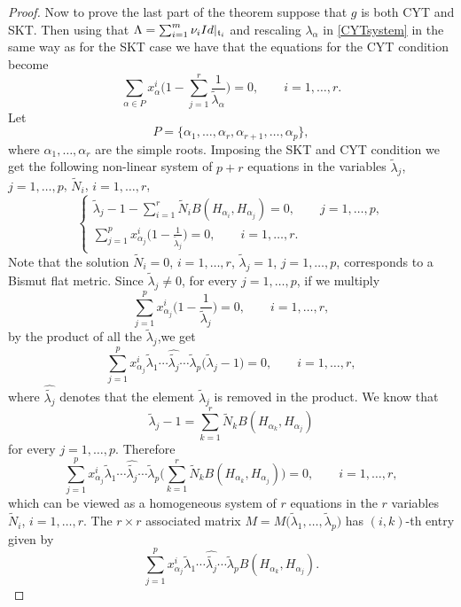 \documentclass[10pt,a4paper]{article}
\numberwithin{equation}{section}
\theoremstyle{definition}
\begin{document}
\begin{proof}
Now to prove the last part of the theorem suppose that $g$ is both CYT and SKT. Then using that $\Lambda = \sum_{i =1}^m \nu_i {\rm Id} |_{\mathfrak t_i}$ and rescaling $\lambda_{\alpha}$ in \eqref{CYTsystem} in the same way as for the SKT case we have that the equations for the CYT condition become
\[
\sum_{\alpha \in P} x_\alpha^i\Bigg(1 - \sum_{j =1}^r \frac{1}{\tilde \lambda_{\alpha}} \Bigg) = 0, \qquad i = 1, \dots ,r.
\]
Let
\[
P = \{ \alpha_1, \dots, \alpha_r, \alpha_{r + 1}, \dots, \alpha_p \},
\]
where $\alpha_1, \dots, \alpha_r$ are the simple roots.
Imposing the SKT and CYT condition we get the following non-linear system of $p + r$ equations in the variables $\tilde \lambda_{j}$, $j =1, \dots, p$, $\tilde N_i$, $i = 1, \dots, r$,
\begin{equation}\label{newsystem}
 \begin{cases}
\displaystyle \tilde \lambda_{j}-1 - \sum_{i = 1}^r \tilde N_i B(H_{\alpha_i}, H_{\alpha_j})=0, \qquad j = 1, \dots, p,\\
\displaystyle \sum_{j=1}^p x_{\alpha_j}^i \bigg(1 - \frac{1}{\tilde \lambda_{j}} \bigg) =0, \qquad i = 1, \dots, r.
\end{cases}
\end{equation}
Note that the solution $\tilde N_i =0$, $i=1, \dots, r$, $\tilde \lambda_j = 1$, $j = 1, \dots, p$, corresponds to a Bismut flat metric.
Since $ \tilde \lambda_j \neq 0$, for every $j = 1, \dots, p$, if we multiply
\[
\sum_{j=1}^p x_{\alpha_j}^i \bigg(1 - \frac{1}{\tilde \lambda_{j}} \bigg) =0, \qquad i = 1, \dots, r,
\]
by the product of all the $\tilde \lambda_j$,we get
\[
\sum_{j=1}^p x_{\alpha_j}^i \tilde \lambda_1 \cdots \hat{\tilde {\lambda_j}} \cdots \tilde \lambda _p \big(\tilde \lambda_j - 1\big) =0, \qquad i = 1, \dots, r,
\]
where $\hat{ \tilde {\lambda_{j} }}$ denotes that the element $\tilde \lambda_{j}$ is removed in the product. We know that
\[
\tilde \lambda_{j}-1 = \sum_{k = 1}^r \tilde N_k B(H_{\alpha_k}, H_{\alpha_j})
\]
for every $j = 1, \dots, p$. Therefore
\[
\sum_{j=1}^p x_{\alpha_j}^i \tilde \lambda_1 \cdots \hat{\tilde {\lambda_j}} \cdots \tilde \lambda _p \Bigg (\sum_{k = 1}^r \tilde N_k B(H_{\alpha_k}, H_{\alpha_j})\Bigg)=0, \qquad i = 1, \dots, r,
\]
 which can be viewed as a homogeneous system of $r$ equations in the $r$ variables $\tilde N_i$, $i = 1, \dots, r$. The $r \times r$ associated matrix $M = M\big(\tilde \lambda_1, \dots, \tilde \lambda_p\big)$ has $(i,k)$-th entry given by
\[
\sum_{j=1}^p x_{\alpha_j}^i \tilde \lambda_1 \cdots \hat{\tilde {\lambda_j}} \cdots \tilde \lambda _p B(H_{\alpha_k}, H_{\alpha_j}).
\]
\end{proof}
\end{document}
